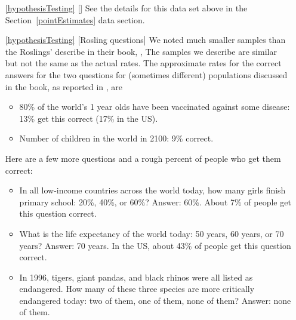\begin{itemize}
\item[\ref{hypothesisTesting}]
    [\datalink{pew\_energy\_2018}]
    See the details for this data set above
    in the Section~\ref{pointEstimates} data section.
\item[\ref{hypothesisTesting}]
    [Rosling questions]
    We noted much smaller samples than the Roslings'
    describe in their book,
    ,
    The samples we describe are similar but not
    the same as the actual rates.
    The approximate rates for the correct answers for the
    two questions for (sometimes different) populations
    discussed in the book, as reported in
    ,
    are
    \begin{itemize}
    \item
        80\% of the world's 1 year olds have been vaccinated
        against some disease:
        13\% get this correct (17\% in the US).
    \item
        Number of children in the world in 2100:
        9\% correct.
    \end{itemize}
    Here are a few more questions and a rough percent
    of people who get them correct:
    \begin{itemize}
    \item
        In all low-income countries across the world today,
        how many girls finish primary school: 20\%, 40\%, or 60\%?
        Answer: 60\%.
        About 7\% of people get this question correct.
    \item
        What is the life expectancy of the world today:
        50 years, 60 years, or 70 years?
        Answer: 70 years.
        In the US, about 43\% of people get this question correct.
    \item
        In 1996, tigers, giant pandas, and black rhinos
        were all listed as endangered.
        How many of these three species are more
        critically endangered today:
        two of them,
        one of them,
        none of them?
        Answer: none of them.

\end{itemize}
\end{itemize}
